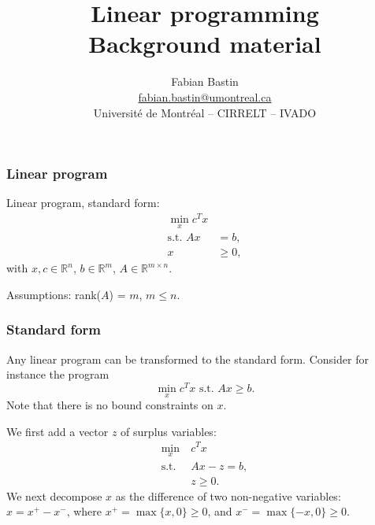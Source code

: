 \documentclass{beamer}
\author[Fabian Bastin]{Fabian Bastin \\ \url{fabian.bastin@umontreal.ca} \\ Université de Montréal -- CIRRELT -- IVADO}
\date{}
\title[Linear programming]{Linear programming\\Background material}
\def\RR{\mathcal{R}}
\def\RR{\mathbb{R}}
\begin{document}
\frame{\titlepage}

\begin{frame}
\frametitle{Linear program}

Linear program, standard form:
\begin{align*}
\min_x c^Tx \\
\mbox{s.t. } Ax &= b,\\
x &\geq 0,
\end{align*}
with $x, c \in \RR^n$, $b \in \RR^m$, $A \in \RR^{m \times n}$.

\mbox{}

Assumptions: rank($A$) = $m$, $m \leq n$.
\end{frame}

\begin{frame}
\frametitle{Standard form}

Any linear program can be transformed to the standard form.
Consider for instance the program
\[
\min_x c^Tx \mbox{ s.t. } Ax \geq b.
\]
Note that there is no bound constraints on $x$.

\mbox{}

We first add a vector $z$ of surplus variables:
\begin{align*}
\min_x\ & c^Tx \\
\mbox{s.t. } & Ax - z = b,\\
& z \geq 0.
\end{align*}
We next decompose $x$ as the difference of two non-negative variables: $x = x^+-x^-$, where $x^+ = \max \lbrace x,
0 \rbrace \geq 0$, and $x^- = \max \lbrace -x, 0 \rbrace \geq 0$.
\end{frame}
\end{document}
